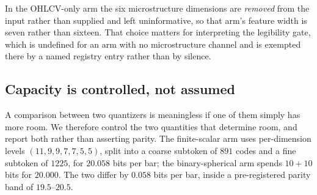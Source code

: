 In the OHLCV-only arm the six microstructure dimensions are \emph{removed} from the input rather
than supplied and left uninformative, so that arm's feature width is seven rather than sixteen.
That choice matters for interpreting the legibility gate, which is undefined for an arm with no
microstructure channel and is exempted there by a named registry entry rather than by silence.

\subsection{Capacity is controlled, not assumed}
\label{sec:parity}

A comparison between two quantizers is meaningless if one of them simply has more room. We
therefore control the two quantities that determine room, and report both rather than asserting
parity. The finite-scalar arm uses per-dimension levels $(11,9,9,7,7,5,5)$, split into a coarse
subtoken of $891$ codes and a fine subtoken of $1225$, for $20.058$ bits per bar; the
binary-spherical arm spends $10+10$ bits for $20.000$. The two differ by $0.058$ bits per bar,
inside a pre-registered parity band of $19.5$--$20.5$.

